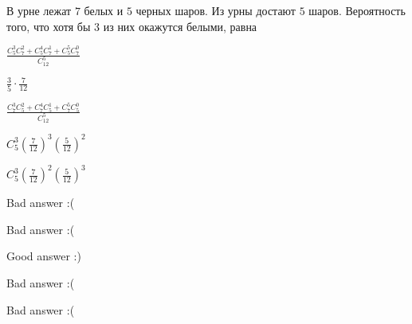 
\begin{question}
В урне лежат \(7\) белых и \(5\) черных шаров. Из урны достают \(5\)
шаров. Вероятность того, что хотя бы \(3\) из них окажутся белыми, равна
\begin{answerlist}
  \item \(\frac{C_5^3 C_7^2 + C_5^4 C_7^1 + C_5^5 C_7^0}{C_{12}^5}\)
  \item \(\frac{3}{5} \cdot \frac{7}{12}\)
  \item \(\frac{C_7^3 C_5^2+C_7^4 C_5^1+C_7^5 C_5^0}{C_{12}^5}\)
  \item \(C_5^3 \left( \frac{7}{12} \right)^3 \left( \frac{5}{12} \right)^2\)
  \item \(C_5^3\left( \frac{7}{12} \right)^2\left( \frac{5}{12} \right)^3\)
\end{answerlist}
\end{question}

\begin{solution}
\begin{answerlist}
  \item Bad answer :(
  \item Bad answer :(
  \item Good answer :)
  \item Bad answer :(
  \item Bad answer :(
\end{answerlist}
\end{solution}

